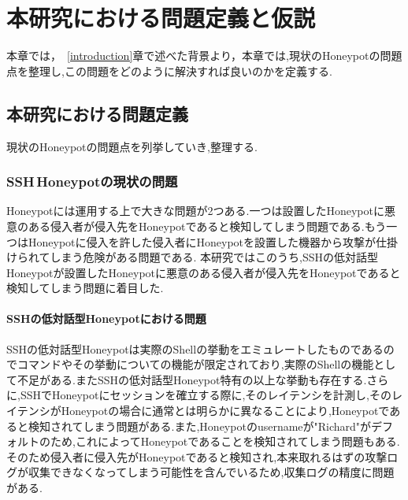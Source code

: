 \chapter{本研究における問題定義と仮説}
\label{approach}

本章では，~\ref{introduction}章で述べた背景より，本章では,現状のHoneypotの問題点を整理し,この問題をどのように解決すれば良いのかを定義する.

\section{本研究における問題定義}
\label{approach:problem}
現状のHoneypotの問題点を列挙していき,整理する.

\subsection{SSH\,Honeypotの現状の問題}
\label{approach:problemofSshHoneypot}
Honeypotには運用する上で大きな問題が2つある.一つは設置したHoneypotに悪意のある侵入者が侵入先をHoneypotであると検知してしまう問題である.もう一つはHoneypotに侵入を許した侵入者にHoneypotを設置した機器から攻撃が仕掛けられてしまう危険がある問題である.
本研究ではこのうち,SSHの低対話型Honeypotが設置したHoneypotに悪意のある侵入者が侵入先をHoneypotであると検知してしまう問題に着目した.

\subsubsection{SSHの低対話型Honeypotにおける問題}
\label{approach:problemofSshLowHoneypot}
SSHの低対話型Honeypotは実際のShellの挙動をエミュレートしたものであるのでコマンドやその挙動についての機能が限定されており,実際のShellの機能として不足がある.またSSHの低対話型Honeypot特有の以上な挙動も存在する.さらに,SSHでHoneypotにセッションを確立する際に,そのレイテンシを計測し,そのレイテンシがHoneypotの場合に通常とは明らかに異なることにより,Honeypotであると検知されてしまう問題がある.また,Honeypotのusernameが"Richard"がデフォルトのため,これによってHoneypotであることを検知されてしまう問題もある.そのため侵入者に侵入先がHoneypotであると検知され,本来取れるはずの攻撃ログが収集できなくなってしまう可能性を含んでいるため,収集ログの精度に問題がある.

\label{approach:LowHoneypotLatency}

\label{approach:LowHoneypotUsername}

